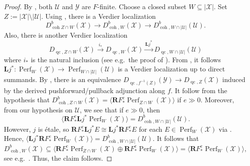 \documentclass[11pt]{amsart}
\theoremstyle{plain}
\theoremstyle{definition}
\numberwithin{equation}{section}
\numberwithin{theorem}{section}
\begin{document}
\begin{proof}
    By , both $\mathcal{U}$ and $\mathcal{Y}$ are $F$-finite. Choose a closed subset $W\subseteq |\mathcal{X}|$. 
    Set $Z:=|\mathcal{X}|\setminus |\mathcal{U}|$. 
    Using , there is a Verdier localization
    \begin{displaymath}
        D^b_{\operatorname{coh}Z\cap W}(\mathcal{X}) \to D^b_{\operatorname{coh},W}(\mathcal{X}) \to D^b_{\operatorname{coh},W\cap |\mathcal{U}|}(\mathcal{U}).
    \end{displaymath}
    Also, there is another Verdier localization
    \begin{displaymath} 
       D_{\operatorname{qc},Z\cap W}(\mathcal{X}) 
       \xrightarrow{i_\ast} D_{\operatorname{qc},W}(\mathcal{X}) 
       \xrightarrow{\mathbf{L} j^\ast} D_{\operatorname{qc},W\cap |\mathcal{U}|}(\mathcal{U})
    \end{displaymath}
    where $i_\ast$ is the natural inclusion (see e.g.\ the proof of \cite[Lemma 5.9]{DeDeyn/Lank/ManaliRahul/Peng:2025}). 
    From \cite[Theorem 2.1]{Neeman:1996}, it follows $\mathbf{L} j^\ast\colon \operatorname{Perf}_W (\mathcal{X}) \to \operatorname{Perf}_{W\cap |\mathcal{U}|}(\mathcal{U})$ is a Verdier localization up to direct summands.
    By \cite[Theorem 4.2]{Hall/Rydh:2023}, there is an equivalence $D_{\operatorname{qc},f^{-1}(Z)}(\mathcal{Y}) \to D_{\operatorname{qc},Z}(\mathcal{X})$ induced by the derived pushforward/pullback adjunction along $f$.
    It follow from the hypothesis that $D^b_{\operatorname{coh},Z\cap W}(\mathcal{X}) = \langle  \mathbf{R} F_\ast^e \operatorname{Perf}_{Z\cap W} (\mathcal{X}) \rangle$ if $e\gg 0$. 
    Moreover, from our hypothesis on $\mathcal{U}$, we see that if $e\gg 0$, then
    \begin{displaymath}
        \langle \mathbf{R} F_\ast^e \mathbf{L} j^\ast \operatorname{Perf}_W (\mathcal{X}) \rangle = D^b_{\operatorname{coh},W\cap |\mathcal{U}|}(\mathcal{U}).
    \end{displaymath}
    However, $j$ is \'{e}tale, so $\mathbf{R} F_\ast^e \mathbf{L} j^\ast E \cong \mathbf{L} j^\ast \mathbf{R} F_\ast^e E$ for each $E\in \operatorname{Perf}_W (\mathcal{X})$ via . 
    Hence, $\langle \mathbf{L} j^\ast \mathbf{R} F_\ast^e \operatorname{Perf}_W (\mathcal{X}) \rangle = D^b_{\operatorname{coh},W\cap |\mathcal{U}|}(\mathcal{U})$. 
    It follows that
    \begin{displaymath}
        D^b_{\operatorname{coh},W}(\mathcal{X}) \subseteq \langle \mathbf{R} F_\ast^e \operatorname{Perf}_{Z\cap W} (\mathcal{X}) \oplus \mathbf{R} F_\ast^e \operatorname{Perf}_W (\mathcal{X}) \rangle = \langle \mathbf{R} F_\ast^e \operatorname{Perf}_W (\mathcal{X}) \rangle,
    \end{displaymath}
    see e.g.\ \cite[Lemma's 5.5 \& 5.6]{DeDeyn/Lank/ManaliRahul:2025}. 
    Thus, the claim follows.
\end{proof}
\end{document}
